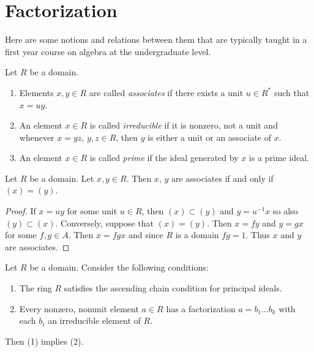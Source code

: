\section{Factorization}
\label{section-factoring}

\noindent
Here are some notions and relations between them that are typically taught
in a first year course on algebra at the undergraduate level.

\begin{definition}
\label{definition-irreducible-prime-element}
Let $R$ be a domain.
\begin{enumerate}
\item Elements $x, y \in R$ are called {\it associates} if
there exists a unit $u \in R^*$ such that $x = uy$.
\item An element $x \in R$ is called {\it irreducible}
if it is nonzero, not a unit and whenever $x = yz$, $y, z \in R$,
then $y$ is either a unit or an associate of $x$.
\item An element $x \in R$ is called {\it prime} if the ideal
generated by $x$ is a prime ideal.
\end{enumerate}
\end{definition}

\begin{lemma}
\label{lemma-easy-divisibility}
Let $R$ be a domain. Let $x, y \in R$.
Then $x$, $y$ are associates if and only if $(x) = (y)$.
\end{lemma}

\begin{proof}
If $x = uy$ for some unit $u \in R$, then $(x) \subset (y)$ and
$y = u^{-1}x$ so also $(y) \subset (x)$. Conversely, suppose that
$(x) = (y)$. Then $x = fy$ and $y = gx$ for some $f, g \in A$.
Then $x = fg x$ and since $R$ is a domain $fg = 1$. Thus
$x$ and $y$ are associates.
\end{proof}

\begin{lemma}
\label{lemma-factorization-exists}
Let $R$ be a domain. Consider the following conditions:
\begin{enumerate}
\item The ring $R$ satisfies the ascending chain condition for
principal ideals.
\item Every nonzero, nonunit element $a \in R$
has a factorization $a = b_1 \ldots b_k$
with each $b_i$ an irreducible element of $R$.
\end{enumerate}
Then (1) implies (2).
\end{lemma}

